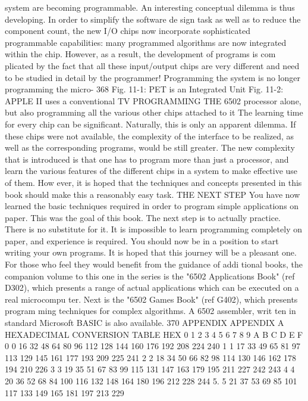 \documentclass{book}
\begin{document}
{{{{{{{{{{{{{{{{{{{{{{{{{{{{{{{{{{{{{{{{{{{{{{{{{{{{{{{{{{{{{{{{{{{{{{{{{{{{{{{{{{{{{{{{{{{{{{{{{{{{{{{{{{{{{{{{{{{{{{{{{{{{{{{{{{{{{{{{{{{{system are becoming programmable. An interesting conceptual
dilemma is thus developing. In order to simplify the software de
sign task as well as to reduce the component count, the new I/O
chips now incorporate sophisticated programmable capabilities:
many programmed algorithms are now integrated within the
chip. However, as a result, the development of programs is com
plicated by the fact that all these input/output chips are very
different and need to be studied in detail by the programmer!
Programming the system is no longer programming the micro-
368
Fig. 11-1: PET is an Integrated Unit
Fig. 11-2: APPLE II uses a conventional TV
PROGRAMMING THE 6502
processor alone, but also programming all the various other chips
attached to it The learning time for every chip can be significant.
Naturally, this is only an apparent dilemma. If these chips were
not available, the complexity of the interface to be realized, as
well as the corresponding programs, would be still greater. The
new complexity that is introduced is that one has to program
more than just a processor, and learn the various features of the
different chips in a system to make effective use of them. How
ever, it is hoped that the techniques and concepts presented in
this book should make this a reasonably easy task.
THE NEXT STEP
You have now learned the basic techniques required in order to
program simple applications on paper. This was the goal of this
book. The next step is to actually practice. There is no substitute
for it. It is impossible to learn programming completely on paper,
and experience is required. You should now be in a position to
start writing your own programs. It is hoped that this journey
will be a pleasant one.
For those who feel they would benefit from the guidance of addi
tional books, the companion volume to this one in the series is the
"6502 Applications Book" (ref D302), which presents a range of
actual applications which can be executed on a real microcompu
ter. Next is the "6502 Games Book" (ref G402), which presents program
ming techniques for complex algorithms. A 6502 assembler, writ
ten in standard Microsoft BASIC is also available.
370
APPENDIX
APPENDIX A
HEXADECIMAL CONVERSION TABLE
HEX
0
1
2
3
4
5
6
7
8
9
A
B
C
D
E
F
0
0
16
32
48
64
80
96
112
128
144
160
176
192
208
224
240
1
1
17
33
49
65
81
97
113
129
145
161
177
193
209
225
241
2
2
18
34
50
66
82
98
114
130
146
162
178
194
210
226
3
3
19
35
51
67
83
99
115
131
147
163
179
195
211
227
242 243
4
4
20
36
52
68
84
100
116
132
148
164
180
196
212
228
244
5.
5
21
37
53
69
85
101
117
133
149
165
181
197
213
229
}}}}}}}}}}}}}}}}}}}}}}}}}}}}}}}}}}}}}}}}}}}}}}}}}}}}}}}}}}}}}}}}}}}}}}}}}}}}}}}}}}}}}}}}}}}}}}}}}}}}}}}}}}}}}}}}}}}}}}}}}}}}}}}}}}}}}}}}}}}}
\end{document}
